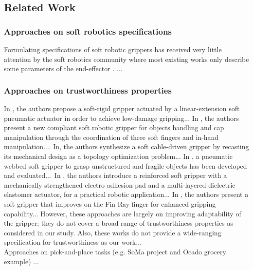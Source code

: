 \documentclass[lettersize,journal]{IEEEtran}
\begin{document}
\subsection{Related Work}\label{relatedwork}

\subsubsection{Approaches on soft robotics specifications} 
Formulating specifications of soft robotic grippers has received very little attention by the soft robotics community where most existing works only describe some parameters of the end-effector \cite{Hong2022,Bhattacharya2019,Tadakuma2020,Loh2014,Nishikawa2019,Mohan2020}.  ...

\subsubsection{Approaches on trustworthiness properties}
In \cite{Cheng2021}, the authors propose a soft-rigid gripper actuated by a linear-extension soft pneumatic actuator in order to achieve low-damage gripping... In \cite{Liu2021}, the authors present a new compliant soft robotic gripper for objects handling and cap manipulation through the coordination of three soft fingers and in-hand manipulation.... In\cite{Chen2018}, the authors synthesize a soft cable-driven gripper by recasting its mechanical design as a topology optimization problem... In \cite{Cai2021}, a pneumatic webbed soft gripper to grasp unstructured and fragile objects has been developed and evaluated... In \cite{Hwang2020}, the authors introduce a reinforced soft gripper with a mechanically strengthened electro adhesion pad and a multi-layered dielectric elastomer actuator, for a practical robotic application... In \cite{Shin2021}, the authors present a soft gripper that improves on the Fin Ray finger for enhanced gripping capability... However, these approaches are largely on improving adaptability of the gripper; they do not cover a broad range of trustworthiness properties as considered in our study. Also, these works do not provide a wide-ranging specification for trustworthiness as our work...\\

Approaches on pick-and-place tasks (e.g. SoMa project and Ocado grocery example) \cite{Negrello2020,Triantafyllou2019,Sotiropoulos2018, Pozzi2016,Bianchi2018}...
\end{document}

